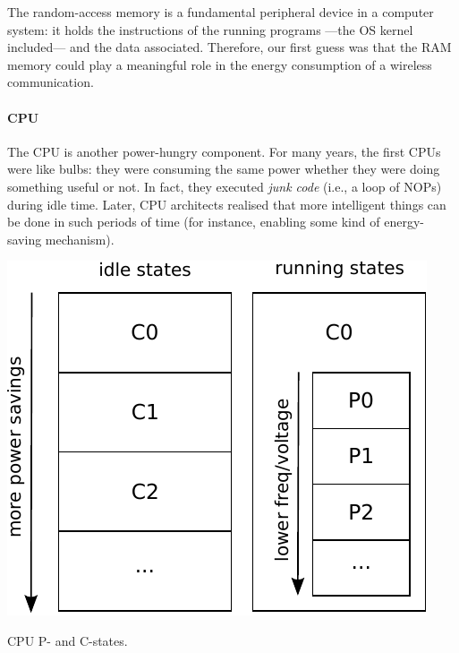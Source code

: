 \documentclass[twoside,nohyper]{tufte-book}
\begin{document}
The random-access memory is a fundamental peripheral device in a computer system: it holds the instructions of the running programs ---the OS kernel included--- and the data associated. Therefore, our first guess was that the RAM memory could play a meaningful role in the energy consumption of a wireless communication.

\hypertarget{cpu}{%
\paragraph{CPU}\label{cpu}}

The CPU is another power-hungry component. For many years, the first CPUs were like bulbs: they were consuming the same power whether they were doing something useful or not. In fact, they executed \emph{junk code} (i.e., a loop of NOPs) during idle time. Later, CPU architects realised that more intelligent things can be done in such periods of time (for instance, enabling some kind of energy-saving mechanism).



\begin{marginfigure}

{\centering \includegraphics[width=1\linewidth]{img/04/states} 

}

\caption[CPU P- and C-states.]{CPU P- and C-states.}\label{fig:states}
\end{marginfigure}
\end{document}

